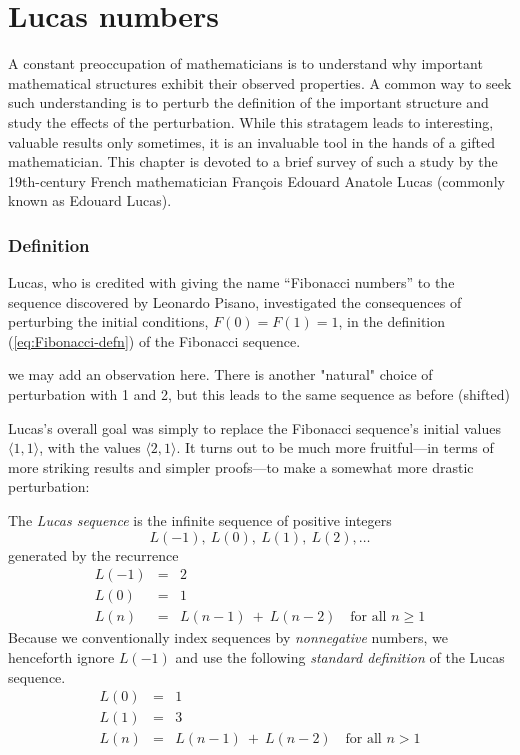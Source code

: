 
\chapter{Lucas numbers}
\label{sec:Lucas-numbers}

A constant preoccupation of mathematicians is to understand why
important mathematical structures exhibit their observed properties.
A common way to seek such understanding is to perturb the definition
of the important structure and study the effects of the perturbation.
While this stratagem leads to interesting, valuable results only
sometimes, it is an invaluable tool in the hands of a gifted
mathematician.  This chapter is devoted to a brief survey of such a
study by the 19th-century French mathematician Fran\c{c}ois Edouard
Anatole Lucas (commonly known as Edouard Lucas).

\subsection{Definition}

Lucas, who is credited with giving the name ``Fibonacci numbers'' to
the sequence discovered by Leonardo Pisano,
investigated the consequences of perturbing the initial conditions,
$F(0) = F(1) = 1$, in the definition (\ref{eq:Fibonacci-defn}) of the
Fibonacci sequence.

{\Denis we may add an observation here. 
There is another "natural" choice of perturbation with 1 and 2, but this leads to the same sequence as before (shifted)}

Lucas's overall goal was simply to replace the Fibonacci sequence's
initial values $\langle 1,1 \rangle$, with the values $\langle 2,1
\rangle$.  It turns out to be much more fruitful---in terms of more
striking results and simpler proofs---to make a somewhat more drastic
perturbation:

The {\it Lucas sequence}  is the
infinite sequence of positive integers
\[ L(-1), \ L(0), \ L(1), \ L(2), \ldots \]
generated by the recurrence
\begin{eqnarray}
\nonumber
L(-1) & = & 2 \\
\label{eq:Lucas-defn-1}
L(0) & = & 1 \\
\nonumber
L(n) & = & L(n-1) \ + \ L(n-2) \ \ \ \mbox{ for all } n \geq 1
\end{eqnarray}
Because we conventionally index sequences by {\em nonnegative}
numbers, we henceforth ignore $L(-1)$ and use the following {\em
  standard definition} of the Lucas sequence.
\begin{eqnarray}
\nonumber
L(0) & = & 1 \\
\label{eq:Lucas-defn-2}
L(1) & = & 3 \\
\nonumber
L(n) & = & L(n-1) \ + \ L(n-2) \ \ \ \mbox{ for all } n > 1
\end{eqnarray}

